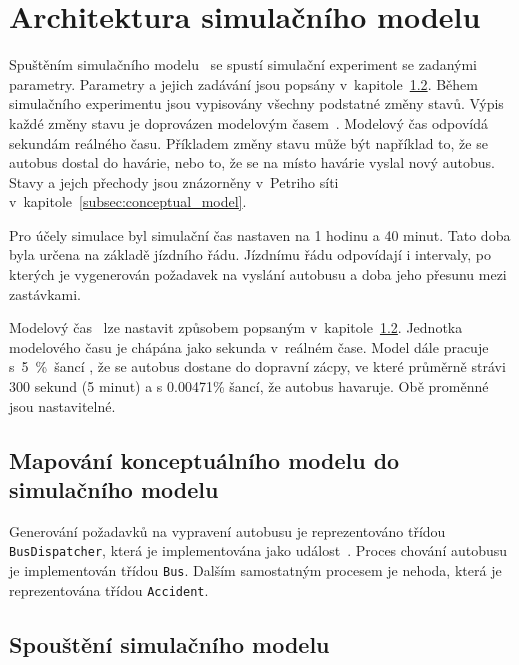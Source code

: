 \documentclass[a4paper]{article}
\begin{document}
    \section{Architektura simulačního modelu}
    \label{sec:architecture}

        Spuštěním simulačního modelu~\cite[snímek 44]{IMS_slides} se spustí simulační experiment se zadanými parametry.
        Parametry a jejich zadávání jsou popsány v~kapitole~\ref{subsec:start}. Během simulačního experimentu jsou vypisovány všechny podstatné změny stavů.
        Výpis každé změny stavu je doprovázen modelovým časem~\cite[snímek 21]{IMS_slides}. Modelový čas odpovídá sekundám reálného času. Příkladem změny stavu může být například to, že se autobus dostal do havárie, nebo to, že se na místo havárie vyslal nový autobus. Stavy a jejch přechody jsou znázorněny v~Petriho síti v~kapitole~\ref{subsec:conceptual_model}.

		Pro účely simulace byl simulační čas nastaven na 1 hodinu a 40 minut. Tato doba byla určena na základě jízdního řádu. Jízdnímu řádu odpovídají i intervaly, po kterých je vygenerován požadavek na vyslání autobusu a doba jeho přesunu mezi zastávkami.

        Modelový čas~\cite[snímek 21]{IMS_slides} lze nastavit způsobem popsaným v~kapitole~\ref{subsec:start}. Jednotka modelového času je chápána jako
        sekunda v~reálném čase.
        Model dále pracuje s~5~\%~šancí , že se autobus dostane do dopravní zácpy, ve které průměrně strávi 300 sekund (5 minut) a s 0.00471\% šancí, že autobus havaruje. Obě proměnné jsou nastavitelné.

        \subsection{Mapování konceptuálního modelu do simulačního modelu}
        \label{subsec:mapping}

            Generování požadavků na vypravení autobusu je reprezentováno třídou \texttt{BusDispatcher}, která je implementována jako
            událost~\cite[snímek 169]{IMS_slides}. Proces chování autobusu je implementován třídou \texttt{Bus}. Dalším samostatným procesem je nehoda, která je reprezentována třídou \texttt{Accident}. 

        \subsection{Spouštění simulačního modelu}
        \label{subsec:start}
\end{document}
